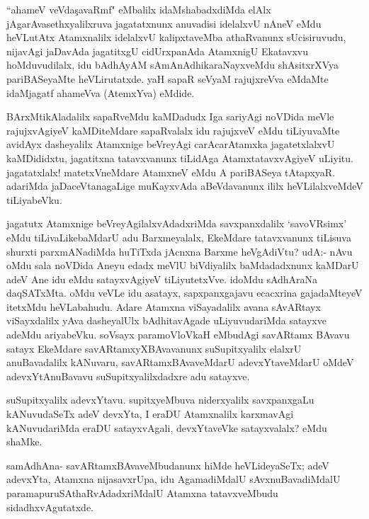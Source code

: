 \begin{artha}%
``ahameV veVda\c savaRmf" eMbalilx idaMshabadxdiMda elAlx jAgarAvasethxyalilxruva jagatatxnunx anuvadisi idelalxvU nAneV eMdu heVLutAtx Atamxnalilx idelalxvU kalipxtaveMba athaRvanunx sUcisiruvudu, nijavAgi jaDavAda jagatitxgU cidUrxpanAda AtamxnigU Ekatavxvu hoMduvudilalx, idu bAdhAyAM sAmAnAdhikaraNayxveMdu shAsitxrXVya pariBASeyaMte heVLirutatxde. yaH sapaR seVyaM rajujxreVva eMdaMte idaMjagatf ahameVva (AtemxYva) eMdide.
\end{artha}

\begin{artha}
BArxMtikAladalilx sapaRveMdu kaMDadudx Iga sariyAgi noVDida meVle rajujxvAgiyeV kaMDiteMdare sapaRvalalx idu rajujxveV eMdu tiLiyuvaMte avidAyx dasheyalilx Atamxnige beVreyAgi carAcarAtamxka jagatetxlalxvU kaMDididxtu, jagatitxna tatavxvanunx tiLidAga AtamxtatavxvAgiyeV uLiyitu. jagatatxlalx! matetxVneMdare AtamxneV eMdu A pariBASeya tAtapxyaR. adariMda jaDaceVtanagaLige muKayxvAda aBeVdavanunx ililx heVLilalxveMdeV tiLiyabeVku. 
\end{artha}

\begin{artha}
jagatutx Atamxnige beVreyAgilalxvAdadxriMda savxpanxdalilx `savoVR\s simx' eMdu tiLivaLikebaMdarU adu Barxmeyalalx, EkeMdare tatavxvanunx tiLisuva shurxti parxmANadiMda huTiTxda jAcnxna Barxme heVgAdiVtu? udA:- nAvu oMdu sala noVDida Aneyu edadx meVlU biVdiyalilx baMdadadxnunx kaMDarU adeV Ane idu eMdu satayxvAgiyeV tiLiyutetxVve. idoMdu sAdhAraNa daqSATxMta. oMdu veVLe idu asatayx, sapxpanxgajavu ecacxrina gajadaMteyeV itetxMdu heVLabahudu. Adare Atamxna viSayadalilx avana sAvARtayx viSayxdalilx yAva dasheyalUlx bAdhitavAgade uLiyuvudariMda satayxve adeMdu ariyabeVku. soV\s sayx paramoVloVkaH eMbudAgi savARtamx BAvavu satayx EkeMdare savARtamxyXBAvavanunx suSupitxyalilx elalxrU anuBavadalilx kANuvaru, savARtamxBAvaveMdarU adevxYtaveMdarU oMdeV adevxYtAnuBavavu suSupitxyalilxdadxre adu satayxve. 
\end{artha}


\begin{artha}
suSupitxyalilx adevxYtavu. supitxyeMbuva niderxyalilx savxpanxgaLu kANuvudaSeTx adeV devxYta, I eraDU Atamxnalilx karxmavAgi kANuvudariMda eraDU satayxvAgali, devxYtaveVke satayxvalalx? eMdu shaMke. 
\end{artha}

\begin{artha}
samAdhAna- savARtamxBAvaveMbudanunx hiMde heVLideyaSeTx; adeV adevxYta, Atamxna nijasavxrUpa, idu AgamadiMdalU sAvxnuBavadiMdalU paramapuruSAthaRvAdadxriMdalU Atamxna tatavxveMbudu sidadhxvAgutatxde. 
\end{artha}

